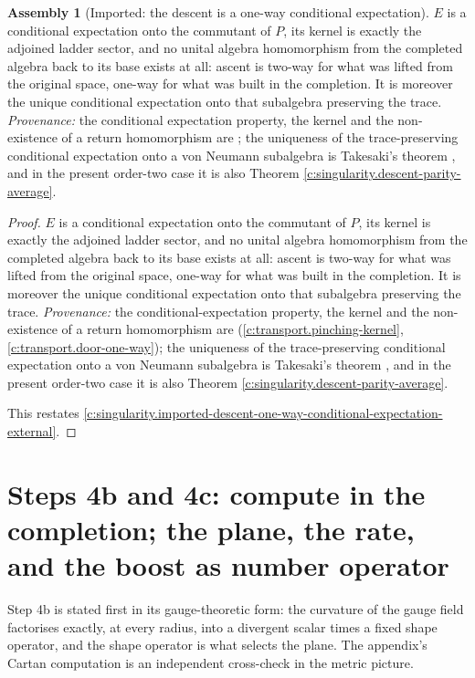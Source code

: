 \documentclass[11pt]{article}
\theoremstyle{definition}
\newtheorem{assembled}[theorem]{Assembly}
\theoremstyle{plain}
\newcommand{\changedmark}[2]{\marginpar{\raggedright\scriptsize\color{#1}#2}}
\begin{document}
\begin{assembled}[Imported: the descent is a one-way conditional expectation]\label{c:singularity.imported-descent-one-way-conditional-expectation}
\changedmark{gray}{reworded}
$E$ is a conditional expectation onto the commutant of $P$, its kernel is exactly the adjoined ladder sector, and no unital algebra homomorphism from the completed algebra back to its base exists at all: ascent is two-way for what was lifted from the original space, one-way for what was built in the completion. It is moreover the unique conditional expectation onto that subalgebra preserving the trace. \emph{Provenance:} the conditional expectation property, the kernel and the non-existence of a return homomorphism are \cite[Prop.~7.5, Thm.~7.6]{ButlerT1}; the uniqueness of the trace-preserving conditional expectation onto a von Neumann subalgebra is Takesaki's theorem \cite{Takesaki1972}, and in the present order-two case it is also Theorem \ref{c:singularity.descent-parity-average}.
\end{assembled}
\begin{proof}
$E$ is a conditional expectation onto the commutant of $P$, its kernel is exactly the adjoined ladder sector, and no unital algebra homomorphism from the completed algebra back to its base exists at all: ascent is two-way for what was lifted from the original space, one-way for what was built in the completion. It is moreover the unique conditional expectation onto that subalgebra preserving the trace. \emph{Provenance:} the conditional-expectation property, the kernel and the non-existence of a return homomorphism are \cite[Prop.~7.5, Thm.~7.6]{ButlerT1} (\ref{c:transport.pinching-kernel}, \ref{c:transport.door-one-way}); the uniqueness of the trace-preserving conditional expectation onto a von Neumann subalgebra is Takesaki's theorem \cite{Takesaki1972}, and in the present order-two case it is also Theorem \ref{c:singularity.descent-parity-average}.

This restates \ref{c:singularity.imported-descent-one-way-conditional-expectation-external}.

\end{proof}

\section{Steps 4b and 4c: compute in the completion; the plane, the rate, and the boost as number operator}

\label{c:note.singularity.setting-steps-4b-4c-compute-completion}
Step 4b is stated first in its gauge-theoretic form: the curvature of the gauge field factorises exactly, at every radius, into a divergent scalar times a fixed shape operator, and the shape operator is what selects the plane. The appendix's Cartan computation is an independent cross-check in the metric picture.
\end{document}
